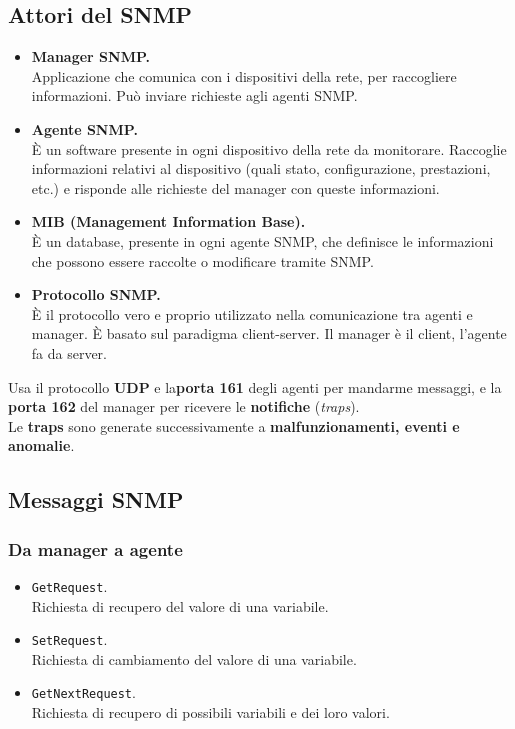 \subsection{Attori del SNMP}
\begin{itemize}
    \item \textbf{Manager SNMP.}\\
    Applicazione che comunica con i dispositivi della rete, per raccogliere informazioni. Può inviare richieste agli agenti SNMP.
    
    \item \textbf{Agente SNMP.}\\
    È un software presente in ogni dispositivo della rete da monitorare. Raccoglie informazioni relativi al dispositivo (quali stato, configurazione, prestazioni, etc.) e risponde alle richieste del manager con queste informazioni.
    
    \item \textbf{MIB (Management Information Base).}\\
    È un database, presente in ogni agente SNMP, che definisce le informazioni che possono essere raccolte o modificare tramite SNMP.
    
    \item \textbf{Protocollo SNMP.}\\
    È il protocollo vero e proprio utilizzato nella comunicazione tra agenti e manager. È basato sul paradigma client-server. Il manager è il client, l'agente fa da server.
\end{itemize}
Usa il protocollo \textbf{UDP} e la\textbf{porta 161} degli agenti per mandarme messaggi, e la \textbf{porta 162} del manager per ricevere le \textbf{notifiche} (\textit{traps}).\\
Le \textbf{traps} sono generate successivamente a \textbf{malfunzionamenti, eventi e anomalie}.

\subsection{Messaggi SNMP}
\subsubsection{Da manager a agente}
\begin{itemize}
    \item \verb|GetRequest|.\\
    Richiesta di recupero del valore di una variabile.
    \item \verb|SetRequest|.\\
    Richiesta di cambiamento del valore di una variabile.
    \item \verb|GetNextRequest|.\\
    Richiesta di recupero di possibili variabili e dei loro valori.
\end{itemize}

